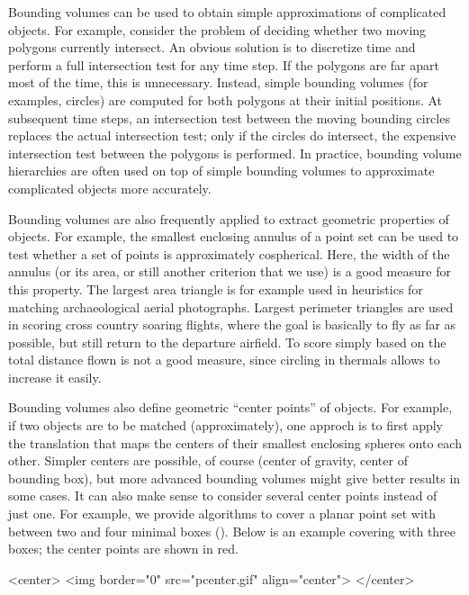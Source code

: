 Bounding volumes can be used to obtain simple approximations of
complicated objects. For example, consider the problem of deciding
whether two moving polygons currently intersect. An obvious solution
is to discretize time and perform a full intersection test for any
time step. If the polygons are far apart most of the time, this is
unnecessary. Instead, simple bounding volumes (for examples, circles)
are computed for both polygons at their initial positions. At
subsequent time steps, an intersection test between the moving
bounding circles replaces the actual intersection test; only if the
circles do intersect, the expensive intersection test between the
polygons is performed. In practice, bounding volume hierarchies are
often used on top of simple bounding volumes to approximate
complicated objects more accurately.


Bounding volumes are also frequently applied to extract
geometric properties of objects. For example, the smallest enclosing
annulus of a point set can be used to test whether a set of points is
approximately cospherical. Here, the width of the annulus (or its
area, or still another criterion that we use) is a good measure for
this property. The largest area triangle is for example used in
heuristics for matching archaeological aerial photographs. Largest
perimeter triangles are used in scoring cross country soaring flights,
where the goal is basically to fly as far as possible, but still
return to the departure airfield. To score simply based on the total
distance flown is not a good measure, since circling in thermals
allows to increase it easily.

Bounding volumes also define geometric ``center points'' of objects.
For example, if two objects are to be matched (approximately), one
approch is to first apply the translation that maps the centers of
their smallest enclosing spheres onto each other.  Simpler centers are
possible, of course (center of gravity, center of bounding box), but
more advanced bounding volumes might give better results in some
cases. It can also make sense to consider several center points
instead of just one. For example, we provide algorithms to cover a
planar point set with between two and four minimal boxes
(). Below is an example covering with
three boxes; the center points are shown in red.

\begin{ccHtmlOnly}
<center>
<img border="0" src="pcenter.gif" align="center">
</center>
\end{ccHtmlOnly} 

